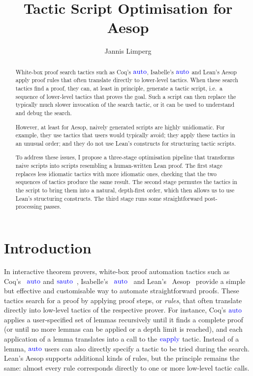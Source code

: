 \documentclass[sigplan,screen]{acmart}
\newcommand{\tac}[1]{\ensuremath{\mathrm{\mathcolor{blue}{#1}}}}
\begin{document}
\begin{abstract}
  White-box proof search tactics such as Coq's \tac{auto}, Isabelle's \tac{auto} and Lean's Aesop apply proof rules that often translate directly to lower-level tactics.
  When these search tactics find a proof, they can, at least in principle, generate a tactic script, i.e.\ a sequence of lower-level tactics that proves the goal.
  Such a script can then replace the typically much slower invocation of the search tactic, or it can be used to understand and debug the search.

  However, at least for Aesop, naively generated scripts are highly unidiomatic.
  For example, they use tactics that users would typically avoid; they apply these tactics in an unusual order; and they do not use Lean's constructs for structuring tactic scripts.

  To address these issues, I propose a three-stage optimisation pipeline that transforms naive scripts into scripts resembling a human-written Lean proof.
  The first stage replaces less idiomatic tactics with more idiomatic ones, checking that the two sequences of tactics produce the same result.
  The second stage permutes the tactics in the script to bring them into a natural, depth-first order, which then allows us to use Lean's structuring constructs.
  The third stage runs some straightforward post-processing passes.
\end{abstract}

\title{Tactic Script Optimisation for Aesop}

\author{Jannis Limperg}

\maketitle

\section{Introduction}%
\label{sec:intro}

In interactive theorem provers, white-box proof automation tactics such as Coq's~\cite{Coq} \tac{auto} and \tac{sauto}~\cite{sauto}, Isabelle's~\cite{Isabelle} \tac{auto}~\cite{IsabelleAuto} and Lean's~\cite{Lean4} Aesop~\cite{Aesop} provide a simple but effective and customisable way to automate straightforward proofs.
These tactics search for a proof by applying proof steps, or \emph{rules}, that often translate directly into low-level tactics of the respective prover.
For instance, Coq's \tac{auto} applies a user-specified set of lemmas recursively until it finds a complete proof (or until no more lemmas can be applied or a depth limit is reached), and each application of a lemma translates into a call to the \tac{eapply} tactic.
Instead of a lemma, \tac{auto} users can also directly specify a tactic to be tried during the search.
Lean's Aesop supports additional kinds of rules, but the principle remains the same: almost every rule corresponds directly to one or more low-level tactic calls.
\end{document}
